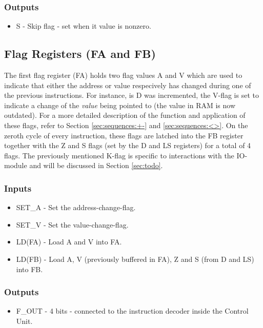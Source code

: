 \subsubsection*{Outputs}
\begin{itemize}
\itemsep0em 
\item S - Skip flag - set when it value is nonzero.
\end{itemize}

\subsection{Flag Registers (FA and FB)} \label{sec:architecture:flags}
The first flag register (FA) holds two flag values A and V which are used to indicate that either the address or value respecively has changed during one of the previous instructions. For instance, is D was incremented, the V-flag is set to indicate a change of the \emph{value} being pointed to (the value in RAM is now outdated). For a more detailed description of the function and application of these flags, refer to Section \ref{sec:sequences:+-} and \ref{sec:sequences:<>}. On the zeroth cycle of every instruction, these flags are latched into the FB register together with the Z and S flags (set by the D and LS registers) for a total of 4 flags. The previously mentioned K-flag is specific to interactions with the IO-module and will be discussed in Section \ref{sec:todo}.

\subsubsection*{Inputs}
\begin{itemize}
\itemsep0em 
\item SET\_A - Set the address-change-flag.
\item SET\_V - Set the value-change-flag.
\item LD(FA) - Load A and V into FA.
\item LD(FB) - Load A, V (previously buffered in FA), Z and S (from D and LS) into FB. 
\end{itemize}

\subsubsection*{Outputs}
\begin{itemize}
\itemsep0em 
\item F\_OUT - 4 bits - connected to the instruction decoder inside the Control Unit.
\end{itemize}


